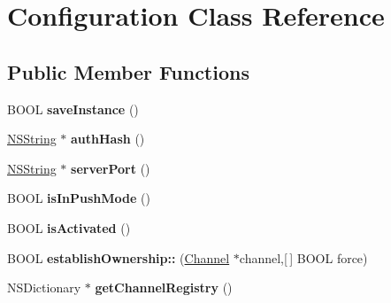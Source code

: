 \hypertarget{interface_configuration}{
\section{\-Configuration \-Class \-Reference}
\label{interface_configuration}
}
\subsection*{\-Public \-Member \-Functions}
\begin{DoxyCompactItemize}
\item 
\hypertarget{interface_configuration_a7b324d3fea494b260da6d774acc9d2d9}{
\-B\-O\-O\-L {\bfseries save\-Instance} ()}
\label{interface_configuration_a7b324d3fea494b260da6d774acc9d2d9}

\item 
\hypertarget{interface_configuration_a428a8a5436830caf8a7037bd56e885b7}{
\hyperlink{class_n_s_string}{\-N\-S\-String} $\ast$ {\bfseries auth\-Hash} ()}
\label{interface_configuration_a428a8a5436830caf8a7037bd56e885b7}

\item 
\hypertarget{interface_configuration_ac03256ca40f4ddabe04e0fa59a0c5cd1}{
\hyperlink{class_n_s_string}{\-N\-S\-String} $\ast$ {\bfseries server\-Port} ()}
\label{interface_configuration_ac03256ca40f4ddabe04e0fa59a0c5cd1}

\item 
\hypertarget{interface_configuration_ab164cd44c779f937c2e4f58bd9afc58c}{
\-B\-O\-O\-L {\bfseries is\-In\-Push\-Mode} ()}
\label{interface_configuration_ab164cd44c779f937c2e4f58bd9afc58c}

\item 
\hypertarget{interface_configuration_a8e2c52e56f93e780dc65b2f27d6d2898}{
\-B\-O\-O\-L {\bfseries is\-Activated} ()}
\label{interface_configuration_a8e2c52e56f93e780dc65b2f27d6d2898}

\item 
\hypertarget{interface_configuration_a042798cb371b1e2f5a5bc56222bd66f1}{
\-B\-O\-O\-L {\bfseries establish\-Ownership\-::} (\hyperlink{interface_channel}{\-Channel} $\ast$channel,\mbox{[}$\,$\mbox{]} \-B\-O\-O\-L force)}
\label{interface_configuration_a042798cb371b1e2f5a5bc56222bd66f1}

\item 
\hypertarget{interface_configuration_aef095a42f68f9b9f684dd6e5e89d8eef}{
\-N\-S\-Dictionary $\ast$ {\bfseries get\-Channel\-Registry} ()}
\label{interface_configuration_aef095a42f68f9b9f684dd6e5e89d8eef}


\end{DoxyCompactItemize}

